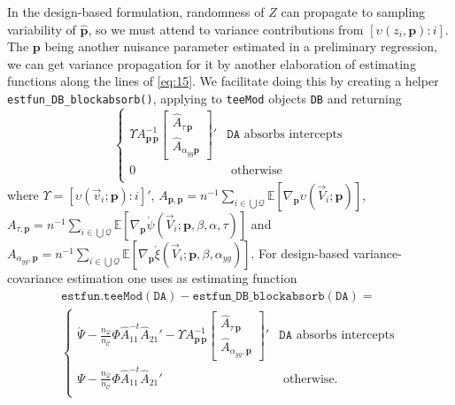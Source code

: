 \documentclass{article}
\newcommand{\absorbInterceptsEF}{\upsilon}
\newcommand{\AbsorbInterceptsEF}{\Upsilon}
\begin{document}
In the design-based formulation, randomness of $Z$ can propagate to
sampling variability of $\hat{\mathbf{p}}$,  so we must attend to
variance contributions from $[\absorbInterceptsEF(z_{i}, \mathbf{p}): i]$.
The $\mathbf{p}$ being another nuisance parameter estimated in a
preliminary regression, we can get variance propagation for it by
another elaboration of estimating functions along the lines of
\eqref{eq:15}. We facilitate doing
this by creating a
helper \texttt{estfun\_DB\_blockabsorb()}, applying to
\texttt{teeMod} objects \texttt{DB} and returning
\begin{equation*}
\begin{cases}
  \AbsorbInterceptsEF{}
  A_{\mathbf{p}\,\mathbf{p}}^{-1}
  \begin{bmatrix}\hat{A}_{\tau\,\mathbf{p}}\\ \hat{A}_{\alpha_{yg}\mathbf{p}}\end{bmatrix}' &
  \mathtt{DA} \text{ absorbs intercepts}\\
0 & \text{ otherwise}\\
\end{cases}
\end{equation*}
where
$\AbsorbInterceptsEF= [\absorbInterceptsEF(\vec{v}_{i}; \mathbf{p}): i]'$,
$A_{\mathbf{p}, \mathbf{p}} = n^{-1}\sum_{i\in \bigcup
  \mathcal{Q}}\mathbb{E} [\nabla_{\mathbf{p}}\absorbInterceptsEF(\vec{V}_{i};
\mathbf{p})]$, $A_{\tau, \mathbf{p}} = n^{-1} \sum_{i\in \bigcup
  \mathcal{Q}}\mathbb{E}[\nabla_{\mathbf{p}}\acute{\psi}(\vec{V}_{i};
\mathbf{p}, \beta, \alpha, \tau)]$ and
$A_{\alpha_{yg}, \mathbf{p}} = n^{-1} \sum_{i\in \bigcup
  \mathcal{Q}}\mathbb{E}[\nabla_{\mathbf{p}}\acute{\xi}(\vec{V}_{i};
\mathbf{p}, \beta, \alpha_{yg})]$.  For design-based variance-covariance
estimation one uses as estimating function
\begin{multline*}\label{eq:25}
  \mathtt{estfun.teeMod(DA)} -
  \mathtt{estfun\_DB\_blockabsorb(DA)} =\\
\begin{cases}
\acute{\Psi} -
  \frac{n_{\mathcal{Q}}}{n_{\mathcal{C}}}\Phi
  \hat{A}_{11}^{-t}\hat{A}_{21}'  - \AbsorbInterceptsEF{}
  A_{\mathbf{p}\,\mathbf{p}}^{-1}\begin{bmatrix}\hat{A}_{\tau\,\mathbf{p}}\\ \hat{A}_{\alpha_{yg}, \mathbf{p}}\end{bmatrix}' & \mathtt{DA} \text{ absorbs intercepts}\\
 \Psi -
  \frac{n_{\mathcal{Q}}}{n_{\mathcal{C}}}\Phi
  \hat{A}_{11}^{-t}\hat{A}_{21}'
 & \text{ otherwise}.\\
\end{cases}
\end{multline*}
\end{document}
